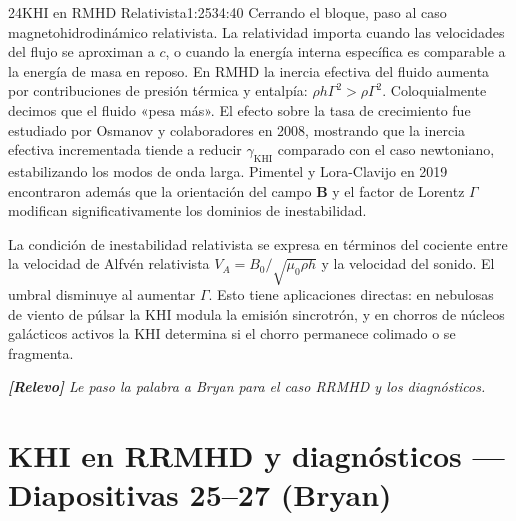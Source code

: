 \documentclass[11pt,a4paper]{article}
\newcommand{\relevo}[1]{%
  \par\medskip
  \noindent\colorbox{tagbg}{\parbox{\dimexpr\linewidth-2\fboxsep\relax}{%
    \small\itshape \textbf{[Relevo]} #1}}\par\medskip}
\begin{document}
\begin{seborador}{24}{KHI en RMHD Relativista}{1:25}{34:40}
Cerrando el bloque, paso al caso magnetohidrodinámico relativista. La
relatividad importa cuando las velocidades del flujo se aproximan a $c$, o
cuando la energía interna específica es comparable a la energía de masa en
reposo. En RMHD la inercia efectiva del fluido aumenta por contribuciones de
presión térmica y entalpía: $\rho h\Gamma^2>\rho\Gamma^2$. Coloquialmente
decimos que el fluido «pesa más». El efecto sobre la tasa de crecimiento fue
estudiado por Osmanov y colaboradores en 2008, mostrando que la inercia
efectiva incrementada tiende a reducir $\gamma_\text{KHI}$ comparado con el
caso newtoniano, estabilizando los modos de onda larga. Pimentel y
Lora-Clavijo en 2019 encontraron además que la orientación del campo
$\mathbf{B}$ y el factor de Lorentz $\Gamma$ modifican significativamente los
dominios de inestabilidad.

La condición de inestabilidad relativista se expresa en términos del cociente
entre la velocidad de Alfvén relativista $V_A=B_0/\sqrt{\mu_0\rho h}$ y la
velocidad del sonido. El umbral disminuye al aumentar $\Gamma$. Esto tiene
aplicaciones directas: en nebulosas de viento de púlsar la KHI modula la
emisión sincrotrón, y en chorros de núcleos galácticos activos la KHI
determina si el chorro permanece colimado o se fragmenta.
\relevo{Le paso la palabra a Bryan para el caso RRMHD y los diagnósticos.}
\end{seborador}

\section{KHI en RRMHD y diagnósticos --- Diapositivas 25--27 (Bryan)}
\end{document}
